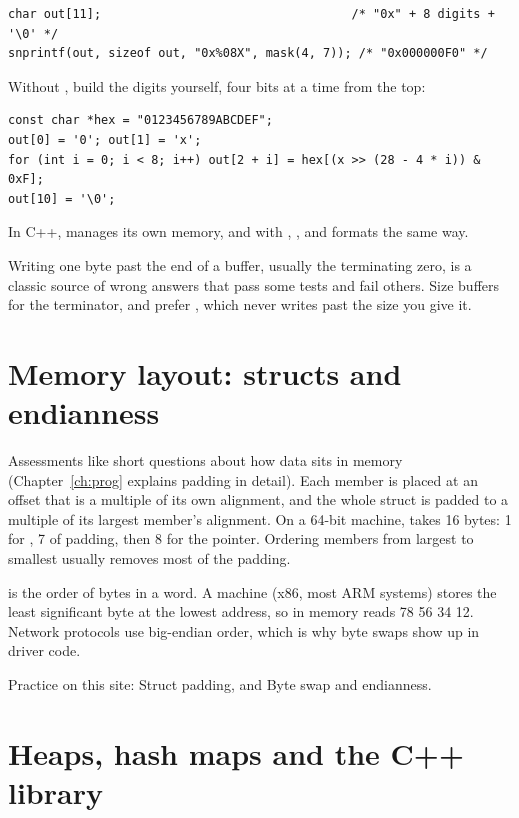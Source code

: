 \begin{lstlisting}
char out[11];                                   /* "0x" + 8 digits + '\0' */
snprintf(out, sizeof out, "0x%08X", mask(4, 7)); /* "0x000000F0" */
\end{lstlisting}

Without , build the digits yourself, four bits at a time from the top:

\begin{lstlisting}
const char *hex = "0123456789ABCDEF";
out[0] = '0'; out[1] = 'x';
for (int i = 0; i < 8; i++) out[2 + i] = hex[(x >> (28 - 4 * i)) & 0xF];
out[10] = '\0';
\end{lstlisting}

In C++,  manages its own memory, and  with , ,  and  formats the same way.

\begin{trap}
Writing one byte past the end of a buffer, usually the terminating zero, is a classic source of wrong answers that pass some tests and fail others. Size buffers for the terminator, and prefer , which never writes past the size you give it.
\end{trap}

\section{Memory layout: structs and endianness}

Assessments like short questions about how data sits in memory (Chapter~\ref{ch:prog} explains padding in detail). Each member is placed at an offset that is a multiple of its own alignment, and the whole struct is padded to a multiple of its largest member's alignment. On a 64-bit machine,  takes 16 bytes: 1 for , 7 of padding, then 8 for the pointer. Ordering members from largest to smallest usually removes most of the padding.

 is the order of bytes in a word. A  machine (x86, most ARM systems) stores the least significant byte at the lowest address, so  in memory reads 78 56 34 12. Network protocols use big-endian order, which is why byte swaps show up in driver code.

Practice on this site: Struct padding, and Byte swap and endianness.

\section{Heaps, hash maps and the C++ library}

